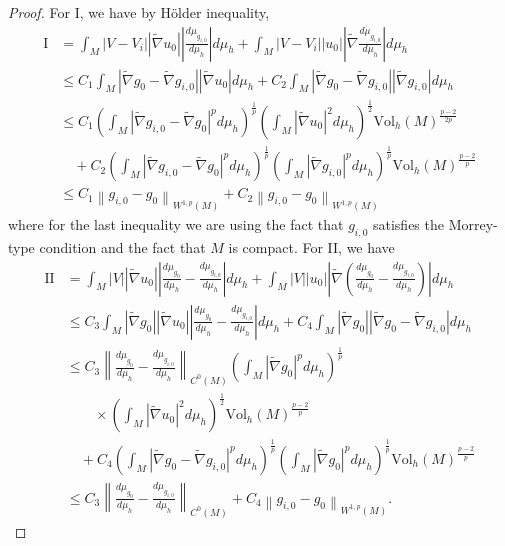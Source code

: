 \documentclass[12pt]{amsart}
\theoremstyle{plain}
\theoremstyle{plain}
\theoremstyle{definition}
\theoremstyle{remark}
\numberwithin{equation}{subsection}
\newcommand{\hdel}{\tilde{\nabla}}
\begin{document}
\begin{proof}
    For I, we have by H\"older inequality,
    \begin{align*}
        \text{I} &= \int_M |V - V_i||\hdel u_0|\left|\frac{d\mu_{g_{i,0}}}{d\mu_h}\right|d\mu_h + \int_M |V - V_i||u_0|\left|\hdel\frac{d\mu_{g_{i,0}}}{d\mu_h}\right|d\mu_h \nonumber \\
        &\leq C_1\int_M |\hdel g_0 - \hdel g_{i,0}||\hdel u_0|d\mu_h + C_2\int_M |\hdel g_0 - \hdel g_{i,0}||\hdel g_{i,0}|d\mu_h \nonumber \\
        &\leq C_1\left(\int_M |\hdel g_{i,0} - \hdel g_0|^pd\mu_h\right)^\frac{1}{p}\left(\int_M |\hdel u_0|^2d\mu_h\right)^\frac{1}{2}\text{Vol}_h(M)^\frac{p-2}{2p} \nonumber \\
        &\quad + C_2\left(\int_M |\hdel g_{i,0} - \hdel g_0|^pd\mu_h\right)^\frac{1}{p}\left(\int_M |\hdel g_{i,0}|^pd\mu_h\right)^\frac{1}{p}\text{Vol}_h(M)^\frac{p-2}{p} \nonumber \\
        &\leq C_1\left\lVert g_{i,0} - g_0\right\rVert_{W^{1,p}(M)} + C_2\left\lVert g_{i,0} - g_0\right\rVert_{W^{1,p}(M)}
    \end{align*}
    where for the last inequality we are using the fact that $g_{i,0}$ satisfies the Morrey-type condition and the fact that $M$ is compact. For II, we have
    \begin{align*}
        \text{II} &= \int_M |V||\hdel u_0|\left|\frac{d\mu_{g_0}}{d\mu_h} - \frac{d\mu_{g_{i,0}}}{d\mu_h}\right|d\mu_h + \int_M |V||u_0|\left|\hdel\left(\frac{d\mu_{g_0}}{d\mu_h}-\frac{d\mu_{g_{i,0}}}{d\mu_h}\right)\right|d\mu_h \nonumber \\
        &\leq C_3\int_M |\hdel g_0||\hdel u_0|\left|\frac{d\mu_{g_0}}{d\mu_h} - \frac{d\mu_{g_{i,0}}}{d\mu_h}\right|d\mu_h + C_4\int_M |\hdel g_0||\hdel g_0 - \hdel g_{i,0}|d\mu_h \nonumber \\
        &\leq C_3\left\lVert \frac{d\mu_{g_0}}{d\mu_h} - \frac{d\mu_{g_{i,0}}}{d\mu_h}\right\rVert_{C^0(M)}\left(\int_M |\hdel g_0|^pd\mu_h\right)^\frac{1}{p} \nonumber \\
        &\qquad \times\left(\int_M |\hdel u_0|^2d\mu_h\right)^\frac{1}{2}\text{Vol}_h(M)^\frac{p-2}{p} \nonumber \\
        &\quad + C_4\left(\int_M |\hdel g_0 - \hdel g_{i,0}|^pd\mu_h\right)^\frac{1}{p}\left(\int_M |\hdel g_0|^pd\mu_h\right)^\frac{1}{p}\text{Vol}_h(M)^\frac{p-2}{p} \nonumber \\
        &\leq C_3\left\lVert \frac{d\mu_{g_0}}{d\mu_h} - \frac{d\mu_{g_{i,0}}}{d\mu_h}\right\rVert_{C^0(M)} + C_4\left\lVert g_{i,0} - g_0\right\rVert_{W^{1,p}(M)}.

\end{align*}
\end{proof}
\end{document}
